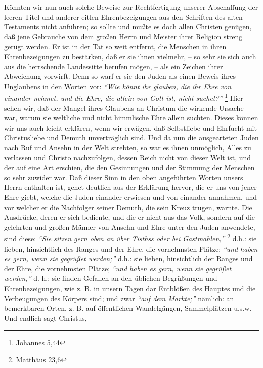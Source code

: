 Könnten wir nun auch solche Beweise zur Rechtfertigung unserer Abschaffung der
leeren Titel und anderer eitlen Ehrenbezeigungen aus den Schriften des alten
Testaments nicht anführen; so sollte und mußte es doch allen Christen genügen,
daß jene Gebrauche von dem großen Herrn und Meister ihrer Religion streng gerügt
werden. Er ist in der Tat so weit entfernt, die Menschen in ihren
Ehrenbezeigungen zu bestärken, daß er sie ihnen vielmehr, -- so sehr sie sich
auch aus die herrschende Landessitte berufen mögen, -- als ein Zeichen ihrer
Abweichung vorwirft. Denn so warf er sie den Juden als einen Beweis ihres
Unglaubens in den Worten vor:
\textit{"`Wie könnt ihr glauben, die ihr Ehre von einander
nehmet, und die Ehre, die allein von Gott ist, nicht suchet?"'}
\footnote{Johannes 5,44}
Hier sehen wir, daß der Mangel ihres Glaubens an Christum die wirkende
Ursache war, warum sie weltliche und nicht himmlische Ehre allein suchten.
Dieses können wir uns auch leicht erklären, wenn wir erwägen, daß Selbstliebe
und Ehrfucht mit Christusliebe und Demuth unverträglich sind. Und da nun die
ausgearteten Juden nach Ruf und Ansehn in der Welt strebten, so war es ihnen
unmöglich, Alles zu verlassen und Christo nachzufolgen, dessen Reich nicht von
dieser Welt ist, und der auf eine Art erschien, die den Gesinnungen und der
Stimmung der Menschen so sehr zuwider war. Daß dieser Sinn in den oben
angeführten Worten unsers Herrn enthalten ist, gehet deutlich aus der Erklärung
hervor, die er uns von jener Ehre giebt, welche die Juden
einander erwiesen und
von einander annahmen, und vor welcher er die Nachfolger seiner Demuth, die sein
Kreuz trugen, warnte. Die Ausdrücke, deren er sich bediente,
und die er nicht
aus das Volk, sondern auf die gelehrten und großen Männer von Ansehn und Ehre
unter den Juden anwendete, sind diese:
\textit{"`Sie sitzen gern oben an über Tisthss
oder bei Gastmahlen,"'}
\footnote{Matthäus 23,6}
d.h.: sie lieben, hinsichtlich des
Ranges und der Ehre, die vornehmsten Plätze;
\textit{"`und haben es gern, wenn sie gegrüßet werden;"'}
d.h.: sie lieben, hinsichtlich der Ranges und der Ehre, die
vornehmsten Plätze;
\textit{"`und haben es gern, wenn sie gegrüßet werden,"'}
d. h.: sie
finden Gefallen an den üblichen Begrüßungen und Ehrenbezeigungen, wie z. B. in
unsern Tagen dar Entblößen des Hauptes und die Verbeugungen des Körpers sind;
und zwar \textit{"`auf dem Markte;"'} nämlich: an bemerkbaren Orten, z. B. auf
öffentlichen Wandelgängen, Sammelplätzen u.s.w. Und endlich sagt Christus,
